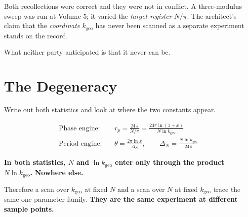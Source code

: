 \documentclass[11pt, letterpaper, openany]{book}
\newcommand{\kgeo}{k_{\mathrm{geo}}}
\begin{document}
\begin{correctionbox}
Both recollections were correct and they were not in conflict. A three-modulus sweep was run at
Volume 5; it varied the \emph{target register} $N/\pi$. The architect's claim that the
\emph{coordinate} $\kgeo$ has never been scanned as a separate experiment stands on the record.

\medskip
\noindent What neither party anticipated is that it never can be.
\end{correctionbox}

\section{The Degeneracy}

Write out both statistics and look at where the two constants appear.

\begin{align}
\text{Phase engine:} \quad & r_p = \frac{24\,s}{N/\pi} = \frac{24\pi \ln(1+x)}{N \ln \kgeo} \\[4pt]
\text{Period engine:} \quad & \theta = \frac{2\pi \ln x}{\Delta_N}, \qquad
\Delta_N = \frac{N \ln \kgeo}{24\pi}
\end{align}

\begin{signalbox}
\textbf{In both statistics, $N$ and $\ln \kgeo$ enter only through the product
$N \ln \kgeo$. Nowhere else.}

\medskip
\noindent Therefore a scan over $\kgeo$ at fixed $N$ and a scan over $N$ at fixed $\kgeo$ trace
the same one-parameter family. \textbf{They are the same experiment at different sample points.}
\end{signalbox}
\end{document}
